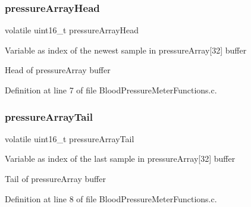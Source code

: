 \subsubsection{\texorpdfstring{pressureArrayHead}{pressureArrayHead}}
{\footnotesize\ttfamily volatile uint16\+\_\+t pressure\+Array\+Head}

Variable as index of the newest sample in pressure\+Array\mbox{[}32\mbox{]} buffer

Head of pressure\+Array buffer 

Definition at line 7 of file Blood\+Pressure\+Meter\+Functions.\+c.

\mbox{\label{group___blood_pressure_meter_functions_ga9c328ec15068b921509854dfaa0adaea_ga9c328ec15068b921509854dfaa0adaea}} 
\subsubsection{\texorpdfstring{pressureArrayTail}{pressureArrayTail}}
{\footnotesize\ttfamily volatile uint16\+\_\+t pressure\+Array\+Tail}

Variable as index of the last sample in pressure\+Array\mbox{[}32\mbox{]} buffer

Tail of pressure\+Array buffer 

Definition at line 8 of file Blood\+Pressure\+Meter\+Functions.\+c.

